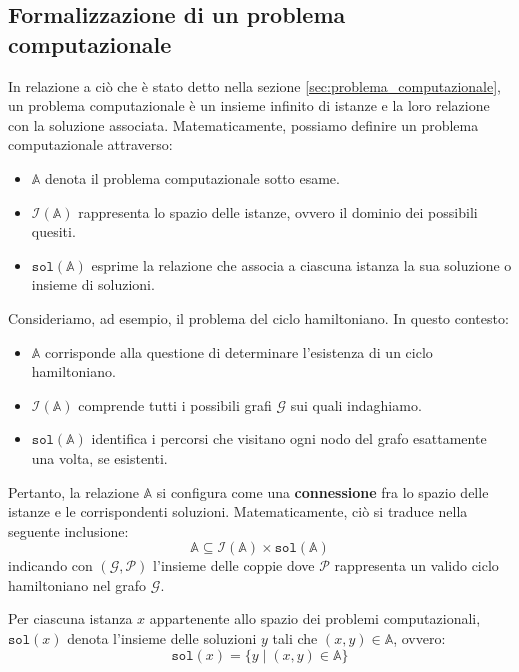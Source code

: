 \subsection{Formalizzazione di un problema computazionale}
In relazione a ciò che è stato detto nella sezione \ref{sec:problema_computazionale}, 
un problema computazionale è un insieme infinito di istanze e la loro relazione con
la soluzione associata. Matematicamente, possiamo definire un problema computazionale
attraverso:
\begin{itemize}
    \item $\mathbb{A}$ denota il problema computazionale sotto esame.
    \item $\mathscr{I}(\mathbb{A})$ rappresenta lo spazio delle istanze,
    ovvero il dominio dei possibili quesiti.
    \item $\texttt{sol}(\mathbb{A})$ esprime la relazione che associa a
    ciascuna istanza la sua soluzione o insieme di soluzioni.
\end{itemize}

\begin{exmp}
Consideriamo, ad esempio, il problema del ciclo hamiltoniano. In questo contesto:
    \begin{itemize}
        \item $\mathbb{A}$ corrisponde alla questione di determinare l'esistenza
        di un ciclo hamiltoniano.
        \item $\mathscr{I}(\mathbb{A})$ comprende tutti i possibili grafi $\mathcal{G}$
        sui quali indaghiamo.
        \item $\texttt{sol}(\mathbb{A})$ identifica i percorsi che visitano ogni nodo del
        grafo esattamente una volta, se esistenti.
    \end{itemize}
\end{exmp}

Pertanto, la relazione $\mathbb{A}$ si configura come una \textbf{connessione} fra lo
spazio delle istanze e le corrispondenti soluzioni. Matematicamente, ciò si traduce
nella seguente inclusione:
\[ \mathbb{A} \subseteq \mathscr{I}(\mathbb{A}) \times \texttt{sol}(\mathbb{A}) \]
indicando con $(\mathcal{G}, \mathcal{P})$ l'insieme delle coppie dove $\mathcal{P}$
rappresenta un valido ciclo hamiltoniano nel grafo $\mathcal{G}$.

Per ciascuna istanza $x$ appartenente allo spazio dei problemi computazionali,
$\texttt{sol}(x)$ denota l'insieme delle soluzioni $y$ tali che $(x, y) \in \mathbb{A}$,
ovvero:
\[
    \texttt{sol}(x) = \{ y \mid (x, y) \in \mathbb{A} \}
\]

